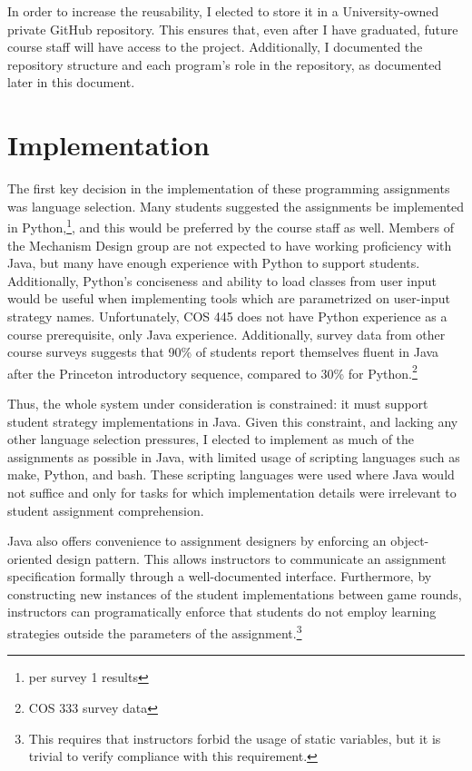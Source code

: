 \documentclass[pageno]{jpaper}
\begin{document}
In order to increase the reusability, I elected to store it in a University-owned private GitHub repository.
This ensures that, even after I have graduated, future course staff will have access to the project.
Additionally, I documented the repository structure and each program's role in the repository, as documented later in this document.

\section*{Implementation}
The first key decision in the implementation of these programming assignments was language selection.
Many students suggested the assignments be implemented in Python,\footnote{per survey 1 results}, and this would be preferred by the course staff as well.
Members of the Mechanism Design group are not expected to have working proficiency with Java, but many have enough experience with Python to support students.
Additionally, Python's conciseness and ability to load classes from user input would be useful when implementing tools which are parametrized on user-input strategy names.
Unfortunately, COS 445 does not have Python experience as a course prerequisite, only Java experience.
Additionally, survey data from other course surveys suggests that 90\% of students report themselves fluent in Java after the Princeton introductory sequence, compared to 30\% for Python.\footnote{COS 333 survey data}

Thus, the whole system under consideration is constrained: it must support student strategy implementations in Java.
Given this constraint, and lacking any other language selection pressures, I elected to implement as much of the assignments as possible in Java, with limited usage of scripting languages such as make, Python, and bash.
These scripting languages were used where Java would not suffice and only for tasks for which implementation details were irrelevant to student assignment comprehension.

Java also offers convenience to assignment designers by enforcing an object-oriented design pattern.
This allows instructors to communicate an assignment specification formally through a well-documented interface.
Furthermore, by constructing new instances of the student implementations between game rounds, instructors can programatically enforce that students do not employ learning strategies outside the parameters of the assignment.\footnote{This requires that instructors forbid the usage of static variables, but it is trivial to verify compliance with this requirement.}
\end{document}
